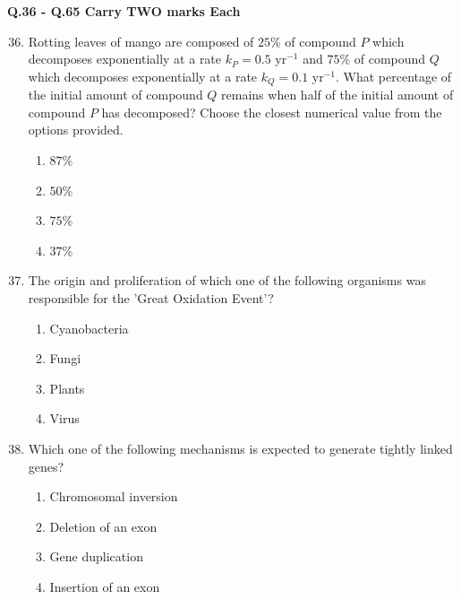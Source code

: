 \documentclass[journal]{IEEEtran}
\begin{document}
\textbf{Q.36 - Q.65 Carry TWO marks Each}
\begin{enumerate}
    \setcounter{enumi}{35}
    \item Rotting leaves of mango are composed of $25$\% of compound $P$ which decomposes exponentially at a rate $k_P = 0.5 \text{ yr}^{-1}$ and $75$\% of compound $Q$ which decomposes exponentially at a rate $k_Q = 0.1 \text{ yr}^{-1}$.
What percentage of the initial amount of compound $Q$ remains when half of the initial amount of compound $P$ has decomposed?
Choose the closest numerical value from the options provided.
    \begin{multicols}{2}
    \begin{enumerate}
        \item $87$\%
        \item $50$\%
        \item $75$\%
        \item $37$\%
    \end{enumerate}
    \end{multicols}

    \item The origin and proliferation of which one of the following organisms was responsible for the 'Great Oxidation Event'?
\begin{multicols}{2}
    \begin{enumerate}
        \item Cyanobacteria
        \item Fungi
        \item Plants
        \item Virus
    \end{enumerate}
    \end{multicols}

    \item Which one of the following mechanisms is expected to generate tightly linked genes?
\begin{multicols}{2}
    \begin{enumerate}
        \item Chromosomal inversion
        \item Deletion of an exon
        \item Gene duplication
        \item Insertion of an exon
    \end{enumerate}
    \end{multicols}


\end{enumerate}
\end{document}
